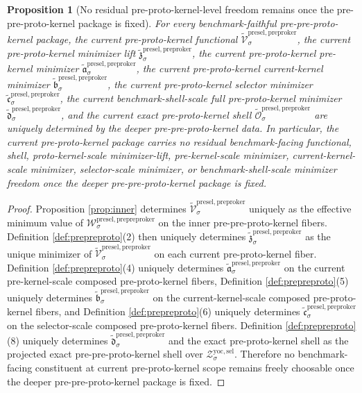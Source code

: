 \documentclass[11pt]{article}
\newcommand{\YoctoSelectorShell}[1]{\mathcal Z_{#1}^{\mathrm{yoc,sel}}}
\newcommand{\PrePreProtoKernelFunctional}[1]{\mathscr W_{#1}^{\mathrm{presel,prepreproker}}}
\newcommand{\InducedPreProtoKernelFunctional}[1]{\widetilde{\mathscr V}_{#1}^{\mathrm{presel,preproker}}}
\newcommand{\InducedPreProtoKernelMinLift}[1]{\widetilde{\mathfrak z}_{#1}^{\mathrm{presel,preproker}}}
\newcommand{\InducedPreProtoKernelPreKernelMin}[1]{\widetilde{\mathfrak a}_{#1}^{\mathrm{presel,preproker}}}
\newcommand{\InducedPreProtoKernelKernelMin}[1]{\widetilde{\mathfrak b}_{#1}^{\mathrm{presel,preproker}}}
\newcommand{\InducedPreProtoKernelSelectorMin}[1]{\widetilde{\mathfrak c}_{#1}^{\mathrm{presel,preproker}}}
\newcommand{\InducedPreProtoKernelFullMin}[1]{\widetilde{\mathfrak d}_{#1}^{\mathrm{presel,preproker}}}
\newcommand{\InducedPreProtoKernelShell}[1]{\widetilde{\mathcal O}_{#1}^{\mathrm{presel,preproker}}}
\newtheorem{proposition}{Proposition}
\begin{document}
\begin{proposition}[No residual pre-proto-kernel-level freedom remains once the pre-pre-proto-kernel package is fixed]
\label{prop:nofreedom}
For every benchmark-faithful pre-pre-proto-kernel package, the current pre-proto-kernel functional \(\InducedPreProtoKernelFunctional{\sigma}\), the current pre-proto-kernel minimizer lift \(\InducedPreProtoKernelMinLift{\sigma}\), the current pre-proto-kernel pre-kernel minimizer \(\InducedPreProtoKernelPreKernelMin{\sigma}\), the current pre-proto-kernel current-kernel minimizer \(\InducedPreProtoKernelKernelMin{\sigma}\), the current pre-proto-kernel selector minimizer \(\InducedPreProtoKernelSelectorMin{\sigma}\), the current benchmark-shell-scale full pre-proto-kernel minimizer \(\InducedPreProtoKernelFullMin{\sigma}\), and the current exact pre-proto-kernel shell \(\InducedPreProtoKernelShell{\sigma}\) are uniquely determined by the deeper pre-pre-proto-kernel data. In particular, the current pre-proto-kernel package carries no residual benchmark-facing functional, shell, proto-kernel-scale minimizer-lift, pre-kernel-scale minimizer, current-kernel-scale minimizer, selector-scale minimizer, or benchmark-shell-scale minimizer freedom once the deeper pre-pre-proto-kernel package is fixed.
\end{proposition}

\begin{proof}
Proposition \ref{prop:inner} determines \(\InducedPreProtoKernelFunctional{\sigma}\) uniquely as the effective minimum value of \(\PrePreProtoKernelFunctional{\sigma}\) on the inner pre-pre-proto-kernel fibers. Definition \ref{def:prepreproto}(2) then uniquely determines \(\InducedPreProtoKernelMinLift{\sigma}\) as the unique minimizer of \(\InducedPreProtoKernelFunctional{\sigma}\) on each current pre-proto-kernel fiber. Definition \ref{def:prepreproto}(4) uniquely determines \(\InducedPreProtoKernelPreKernelMin{\sigma}\) on the current pre-kernel-scale composed pre-proto-kernel fibers, Definition \ref{def:prepreproto}(5) uniquely determines \(\InducedPreProtoKernelKernelMin{\sigma}\) on the current-kernel-scale composed pre-proto-kernel fibers, and Definition \ref{def:prepreproto}(6) uniquely determines \(\InducedPreProtoKernelSelectorMin{\sigma}\) on the selector-scale composed pre-proto-kernel fibers. Definition \ref{def:prepreproto}(8) uniquely determines \(\InducedPreProtoKernelFullMin{\sigma}\) and the exact pre-proto-kernel shell as the projected exact pre-pre-proto-kernel shell over \(\YoctoSelectorShell{\sigma}\). Therefore no benchmark-facing constituent at current pre-proto-kernel scope remains freely choosable once the deeper pre-pre-proto-kernel package is fixed.
\end{proof}
\end{document}
